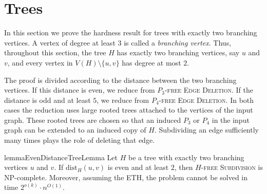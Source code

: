 \documentclass[a4paper,UKenglish,cleveref, autoref, thm-restate]{lipics-v2021}
\newcommand{\dist}{\mathrm{dist}}
\begin{document}
\section{Trees}
\label{sec:trees}

In this section we prove the hardness result for trees with exactly two branching
vertices.  A vertex of degree at least $3$ is called a \emph{branching vertex}.
Thus, throughout this section, the tree $H$ has exactly two branching vertices,
say $u$ and $v$, and every vertex in $V(H)\setminus\{u,v\}$ has degree at most
$2$.

\TreeTheorem*

The proof is divided according to the distance between the two branching
vertices.  If this distance is even, we reduce from
\textsc{$P_3$-free Edge Deletion}.  If the distance is odd and at least $5$, we
reduce from \textsc{$P_4$-free Edge Deletion}.  In both cases the reduction uses
large rooted trees attached to the vertices of the input graph.  These rooted
trees are chosen so that an induced $P_3$ or $P_4$ in the input graph can be
extended to an induced copy of $H$.  Subdividing an edge sufficiently many times
plays the role of deleting that edge.





\begin{restatable}{lemma}{EvenDistanceTreeLemma}
\label{lem:tree-even-distance}
Let $H$ be a tree with exactly two branching vertices $u$ and $v$.
If $\dist_H(u,v)$ is even and at least $2$, then
\textsc{$H$-free Subdivision} is \textsf{NP}-complete.
Moreover, assuming the ETH, the problem cannot be solved in time
$2^{o(k)}\cdot n^{O(1)}$.
\end{restatable}
\end{document}
